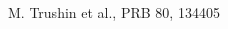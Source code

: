 \documentclass[prb,showpacs,amsmath,amssymb,superscriptaddress,twocolumn,floatfix]{revtex4-1}
\begin{document}
\begin{thebibliography}{99}





 M. Trushin et al., PRB 80, 134405

  
\end{thebibliography}
\end{document}
